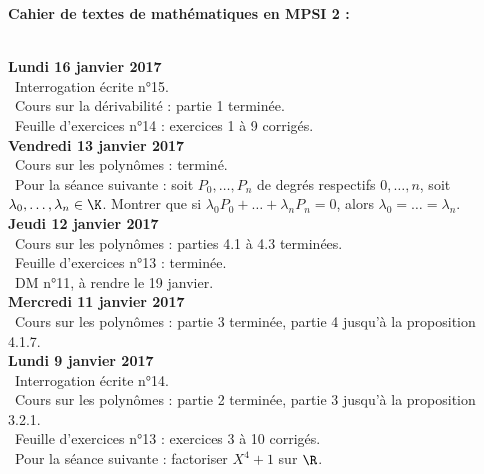 \documentclass[12pt,a4paper]{article}
\begin{document}
\begin{center}
\Large\bf Cahier de textes de mathématiques en MPSI 2 :
\end{center}
\vspace{1cm}
\vspace{.4cm}\\


\noindent\textbf{Lundi 16 janvier 2017}\\
\bu\ Interrogation écrite n°15.\\
\bu\ Cours sur la dérivabilité : partie 1 terminée.\\
\bu\ Feuille d'exercices n°14 : exercices 1 à 9 corrigés. \vspace{.4cm}\\

\noindent\textbf{Vendredi 13 janvier 2017}\\
\bu\ Cours sur les polynômes : terminé.\\
\bu\ Pour la séance suivante : soit $P_0,\dots,P_n$ de degrés respectifs $0,\dots,n$, soit $\lambda_0,\dots,\lambda_n \in \K$. Montrer que si $\lambda_0 P_0 + \dots + \lambda_nP_n = 0$, alors $\lambda_0 = \dots = \lambda_n$. \vspace{.4cm}\\


\noindent\textbf{Jeudi 12 janvier 2017}\\
\bu\ Cours sur les polynômes : parties 4.1 à 4.3 terminées.\\
\bu\ Feuille d'exercices n°13 : terminée.\\
\bu\ DM n°11, à rendre le 19 janvier.\vspace{.4cm}\\

\noindent\textbf{Mercredi 11 janvier 2017}\\
\bu\ Cours sur les polynômes : partie 3 terminée, partie 4 jusqu'à la proposition 4.1.7.\vspace{.4cm}\\

\noindent\textbf{Lundi 9 janvier 2017}\\
\bu\ Interrogation écrite n°14.\\
\bu\ Cours sur les polynômes : partie 2 terminée, partie 3 jusqu'à la proposition 3.2.1.\\
\bu\ Feuille d'exercices n°13 : exercices 3 à 10 corrigés.\\
\bu\ Pour la séance suivante : factoriser $X^4+1$ sur $\R$.\vspace{.4cm}\\
\end{document}
